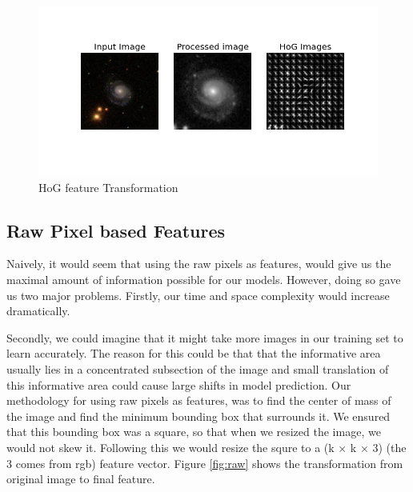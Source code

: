 \documentclass[10pt]{article}
\begin{document}
\begin{figure}[h]
\begin{center}
\includegraphics[scale=0.6]{images/HoG_features_noisy.png}
\caption{HoG feature Transformation}
\end{center}
\label{fig:hog}
\end{figure}


\subsection*{Raw Pixel based Features}

Naively, it would seem that using the raw pixels as features, would give us the maximal amount of information possible for our models. However, doing so gave us two major problems. Firstly, our time and space complexity would increase dramatically.

Secondly, we could imagine that it might take more images in our training set to learn accurately. The reason for this could be that that the informative area usually lies in a concentrated subsection of the image and small translation of this informative area could cause large shifts in model prediction.
Our methodology for using raw pixels as features, was to find the center of mass of the image and find the minimum bounding box that surrounds it. We ensured that this bounding box was a square, so that when we resized the image, we would not skew it. Following this we would resize the squre to a (k × k × 3) (the 3 comes from rgb) feature vector. Figure \ref{fig:raw} shows the transformation from original image to final feature.
\end{document}
